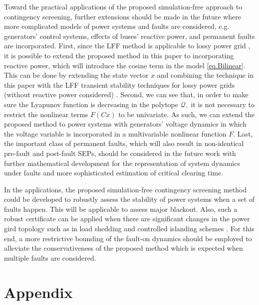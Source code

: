 \documentclass[final]{IEEEtran}
\begin{document}
Toward the practical applications of the proposed simulation-free
approach to contingency screening, further extensions should be
made in the future where more complicated models of power systems
and faults are considered,
  e.g. generators' control systems, effects of buses' reactive power, and permanent faults are incorporated.
First, since the LFF method is applicable to lossy power grid
\cite{VuTuritsyn:2014acc}, it is possible to extend the proposed
method in this paper to incorporating reactive power, which will
introduce the cosine term in the model \eqref{eq.Bilinear}. This
can be done by extending the state vector $x$ and combining the
technique in this paper with the LFF transient stability
techniques for lossy power grids (without reactive power
considered) \cite{VuTuritsyn:2014acc}. Second, we can see that, in
order to make sure the Lyapunov function is decreasing in the
polytope $\mathcal{Q},$ it is not necessary to restrict the
nonlinear terms $F(Cx)$ to be univariate. As such, we can extend
the proposed method to power systems with generators' voltage
dynamics in which the voltage variable is incorporated in a
multivariable nonlinear function $F.$ Last, the important class of
permanent faults, which will also result in non-identical
pre-fault and post-fault SEPs, should be considered in the future
work with further mathematical development for the representation
of system dynamics under faults and more sophisticated estimation
of critical clearing time.

In the applications, the proposed simulation-free contingency
screening method could be developed to robustly assess the
stability of power systems when a set of faults happen. This will
be applicable to assess major blackout. Also, such a robust
certificate can be applied when there are significant changes in
the power gird topology such as in load shedding
\cite{7077021,siddiqui2015preventive,5706912} and controlled
islanding schemes
\cite{januszquiros2014constrained,6774471,6980139,7024905,pfitzner2011controlled}.
For this end, a more restrictive bounding of the fault-on dynamics
should be employed to alleviate the conservativeness of the
proposed method which is expected when multiple faults are
considered.





\section{Appendix}
\end{document}
